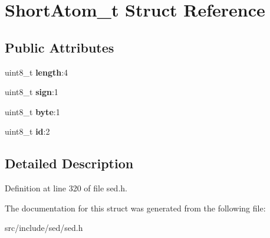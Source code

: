 \hypertarget{structShortAtom__t}{}\section{Short\+Atom\+\_\+t Struct Reference}
\label{structShortAtom__t}
\subsection*{Public Attributes}
\begin{DoxyCompactItemize}
\item 
\hypertarget{structShortAtom__t_aada965b95a29f22dd09682656afa2bf8}{}uint8\+\_\+t {\bfseries length}\+:4\label{structShortAtom__t_aada965b95a29f22dd09682656afa2bf8}

\item 
\hypertarget{structShortAtom__t_a58add9cd1e7105b9514bf88476d6b537}{}uint8\+\_\+t {\bfseries sign}\+:1\label{structShortAtom__t_a58add9cd1e7105b9514bf88476d6b537}

\item 
\hypertarget{structShortAtom__t_aba07a9b5d6d81a752efc4399b7c08bdd}{}uint8\+\_\+t {\bfseries byte}\+:1\label{structShortAtom__t_aba07a9b5d6d81a752efc4399b7c08bdd}

\item 
\hypertarget{structShortAtom__t_a40ccae5863cddc172ae596fda51b63fd}{}uint8\+\_\+t {\bfseries id}\+:2\label{structShortAtom__t_a40ccae5863cddc172ae596fda51b63fd}

\end{DoxyCompactItemize}


\subsection{Detailed Description}


Definition at line 320 of file sed.\+h.



The documentation for this struct was generated from the following file\+:\begin{DoxyCompactItemize}
\item 
src/include/sed/sed.\+h\end{DoxyCompactItemize}
